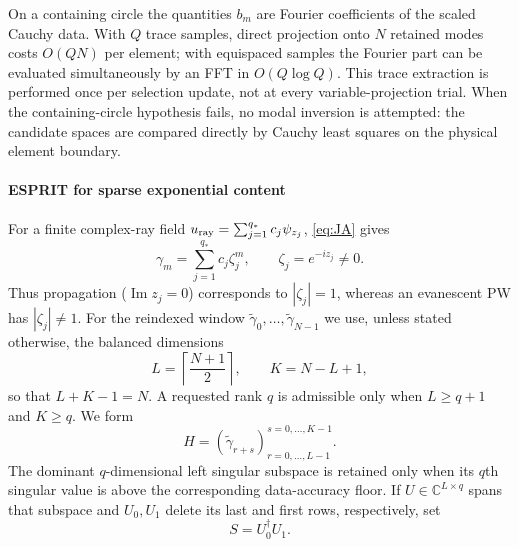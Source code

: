 \documentclass[11pt]{article}
\newcommand{\ii}{i}
\newcommand{\C}{\mathbb{C}}
\renewcommand{\Im}{\operatorname{Im}}
\numberwithin{equation}{section}
\begin{document}
On a containing circle the quantities $b_m$ are Fourier coefficients of the scaled Cauchy data.  With $Q$ trace samples, direct projection onto $N$ retained modes costs $O(QN)$ per element; with equispaced samples the Fourier part can be evaluated simultaneously by an FFT in $O(Q\log Q)$.  This trace extraction is performed once per selection update, not at every variable-projection trial.  When the containing-circle hypothesis fails, no modal inversion is attempted: the candidate spaces are compared directly by Cauchy least squares on the physical element boundary.

\paragraph{ESPRIT for sparse exponential content}
For a finite complex-ray field $u_{\rm ray}=\sum_{j=1}^{q_*}c_j\psi_{z_j}$, \eqref{eq:JA} gives
\begin{equation}\label{eq:esprit-sequence}
 \gamma_m=\sum_{j=1}^{q_*}c_j\zeta_j^m,
 \qquad \zeta_j=e^{-\ii z_j}\ne0.
\end{equation}
Thus propagation ($\Im z_j=0$) corresponds to $|\zeta_j|=1$, whereas an evanescent PW has $|\zeta_j|\ne1$.  For the reindexed window $\widetilde\gamma_0,\ldots,\widetilde\gamma_{N-1}$ we use, unless stated otherwise, the balanced dimensions
\[
 L=\left\lceil\frac{N+1}{2}\right\rceil,\qquad K=N-L+1,
\]
so that $L+K-1=N$.  A requested rank $q$ is admissible only when $L\ge q+1$ and $K\ge q$.  We form
\begin{equation}\label{eq:esprit-H}
 H=(\widetilde\gamma_{r+s})_{r=0,\ldots,L-1}^{s=0,\ldots,K-1}.
\end{equation}
The dominant $q$-dimensional left singular subspace is retained only when its $q$th singular value is above the corresponding data-accuracy floor.  If $U\in\C^{L\times q}$ spans that subspace and $U_0,U_1$ delete its last and first rows, respectively, set
\begin{equation}\label{eq:esprit-S}
 S=U_0^\dagger U_1.
\end{equation}
\end{document}
